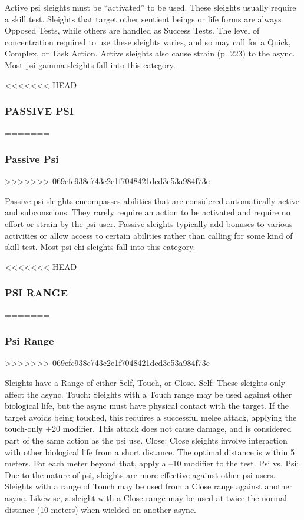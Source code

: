 Active psi sleights must be “activated” to be used. These sleights usually require a skill test. Sleights that target other sentient beings or life forms are always Opposed Tests, while others are handled as Success Tests. The level of concentration required to use these sleights varies, and so may call for a Quick, Complex, or Task Action. Active sleights also cause strain (p. 223) to the async. Most psi-gamma sleights fall into this category. 

<<<<<<< HEAD \subsubsection{PASSIVE PSI} ======= \subsubsection{Passive Psi} >>>>>>> 069efc938e743c2e1f7048421dcd3e53a984f73e 

Passive psi sleights encompasses abilities that are considered automatically active and subconscious. They rarely require an action to be activated and require no effort or strain by the psi user. Passive sleights typically add bonuses to various activities or allow access to certain abilities rather than calling for some kind of skill test. Most psi-chi sleights fall into this category. 

<<<<<<< HEAD \subsubsection{PSI RANGE} ======= \subsubsection{Psi Range} >>>>>>> 069efc938e743c2e1f7048421dcd3e53a984f73e 

Sleights have a Range of either Self, Touch, or Close. Self: These sleights only affect the async. Touch: Sleights with a Touch range may be used against other biological life, but the async must have physical contact with the target. If the target avoids being touched, this requires a successful melee attack, applying the touch-only +20 modifier. This attack does not cause damage, and is considered part of the same action as the psi use. Close: Close sleights involve interaction with other biological life from a short distance. The optimal distance is within 5 meters. For each meter beyond that, apply a –10 modifier to the test. Psi vs. Psi: Due to the nature of psi, sleights are more effective against other psi users. Sleights with a range of Touch may be used from a Close range against another async. Likewise, a sleight with a Close range may be used at twice the normal distance (10 meters) when wielded on another async. 

